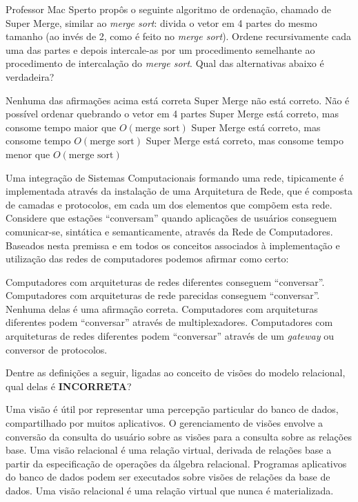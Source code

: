 \documentclass[12pt, addpoints]{exam}
\begin{document}
\begin{questions}
\question

Professor Mac Sperto propôs o seguinte algoritmo de ordenação, chamado de Super Merge, similar ao \textit{merge sort}: divida o vetor em 4 partes do mesmo tamanho (ao invés de 2, como é feito no \textit{merge sort}). Ordene recursivamente cada uma das partes e depois intercale-as por um procedimento semelhante ao procedimento de intercalação do \textit{merge sort}. Qual das alternativas abaixo é verdadeira?
\begin{choices}
\choice Nenhuma das afirmações acima está correta
\choice Super Merge não está correto. Não é possível ordenar quebrando o vetor em 4 partes
\choice Super Merge está correto, mas consome tempo maior que \( O(\text{merge sort}) \)
\choice Super Merge está correto, mas consome tempo \( O(\text{merge sort}) \)
\choice Super Merge está correto, mas consome tempo menor que \( O(\text{merge sort}) \)
\end{choices}

\question

Uma integração de Sistemas Computacionais formando uma rede, tipicamente é implementada através da instalação de uma Arquitetura de Rede, que é composta de camadas e protocolos, em cada um dos elementos que compõem esta rede. Considere que estações “conversam” quando aplicações de usuários conseguem comunicar-se, sintática e semanticamente, através da Rede de Computadores. Baseados nesta premissa e em todos os conceitos associados à implementação e utilização das redes de computadores podemos afirmar como certo:


\begin{choices}
\choice Computadores com arquiteturas de redes diferentes conseguem “conversar”.
\choice Computadores com arquiteturas de rede parecidas conseguem “conversar”.
\choice Nenhuma delas é uma afirmação correta.
\choice Computadores com arquiteturas diferentes podem “conversar” através de multiplexadores.
\choice Computadores com arquiteturas de redes diferentes podem “conversar” através de um \textit{gateway} ou conversor de protocolos.
\end{choices}

\question

Dentre as definições a seguir, ligadas ao conceito de visões do modelo relacional, qual delas é \textbf{INCORRETA}?


\begin{choices}
\choice Uma visão é útil por representar uma percepção particular do banco de dados, compartilhado por muitos aplicativos.
\choice O gerenciamento de visões envolve a conversão da consulta do usuário sobre as visões para a consulta sobre as relações base.
\choice Uma visão relacional é uma relação virtual, derivada de relações base a partir da especificação de operações da álgebra relacional.
\choice Programas aplicativos do banco de dados podem ser executados sobre visões de relações da base de dados.
\choice Uma visão relacional é uma relação virtual que nunca é materializada.
\end{choices}


\end{questions}
\end{document}
